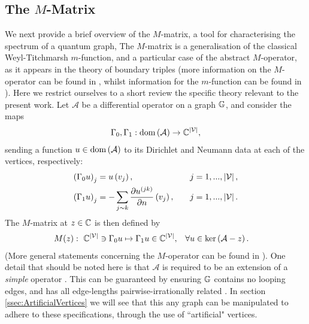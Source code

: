 \subsection{The $M$-Matrix} \label{ssec:MMatrix}
We next provide a brief overview of the $M$-matrix, a tool for characterising the spectrum of a quantum graph, 
The $M$-matrix is a generalisation of the classical Weyl-Titchmarsh $m$-function, and a particular case of the abstract $M$-operator, as it appears in the theory of boundary triples (more information on the $M$-operator can be found in \cite{kochubei1975extensions, kochubei1980characteristic, gorbachuk1991boundary, brown2008boundary, brown2020functional, cherednichenko2020scattering, cherednichenko2018functional}, whilst information for the $m$-function can be found in \cite{titchmarsh1962eigenfunction, atkinson1964discrete}).
Here we restrict ourselves to a short review the specific theory relevant to the present work.
Let $\mathcal{A}$ be a differential operator on a graph $\mathbb{G}$, and consider the maps
\begin{align*}
	\Gamma_0, \Gamma_1: \mathrm{dom}\left( \mathcal{A} \right) \rightarrow \mathbb{C}^{\left\lvert \mathcal{V} \right\rvert},
\end{align*}
sending a function $u\in\mathrm{dom}\left( \mathcal{A} \right)$ to its Dirichlet and Neumann data at each of the vertices, respectively:
\begin{align*}
	\left( \Gamma_0 u \right)_j &= u\left( v_j \right), \quad &j=1,...,\left\lvert \mathcal{V} \right\rvert, \\
	\left( \Gamma_1 u \right)_j &= -\sum_{j\sim k}\dfrac{\partial u^{(jk)}}{\partial n}\left( v_j \right), \quad &j=1,...,\left\lvert \mathcal{V} \right\rvert. 
\end{align*}
The $M$-matrix at $z\in\mathbb{C}$ is then defined by
\begin{align*}
	M(z): \ \mathbb{C}^{\left\lvert \mathcal{V} \right\rvert} \ni \Gamma_0 u \mapsto \Gamma_1 u \in \mathbb{C}^{\left\lvert \mathcal{V} \right\rvert},
	 &\quad \forall u\in\mathrm{ker}\left( \mathcal{A}-z \right).
\end{align*}
(More general statements concerning the $M$-operator can be found in \cite{derkach1991generalized, derkach2014boundary}).
One detail that should be noted here is that $\mathcal{A}$ is required to be an extension of a \emph{simple} operator .
This can be guaranteed by ensuring $\mathbb{G}$ contains no looping edges, and has all edge-lengths pairwise-irrationally related \cite{ashurova2014simplicity}.
In section \ref{ssec:ArtificialVertices} we will see that this any graph can be manipulated to adhere to these specifications, through the use of ``artificial" vertices.

